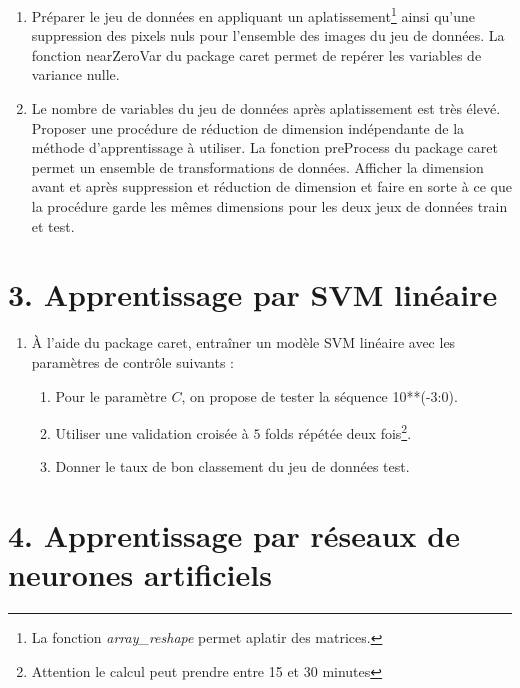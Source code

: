 \documentclass[11pt,]{article}
\begin{document}
\begin{enumerate}
\def\labelenumi{\arabic{enumi}.}
\item
  Préparer le jeu de données en appliquant un aplatissement\footnote{La
    fonction \emph{array\_reshape} permet aplatir des matrices.} ainsi
  qu'une suppression des pixels nuls pour l'ensemble des images du jeu
  de données. La fonction \textsf{nearZeroVar} du package \textsf{caret}
  permet de repérer les variables de variance nulle.
\item
  Le nombre de variables du jeu de données après aplatissement est très
  élevé. Proposer une procédure de réduction de dimension indépendante
  de la méthode d'apprentissage à utiliser. La fonction
  \textsf{preProcess} du package \textsf{caret} permet un ensemble de
  transformations de données. Afficher la dimension avant et après
  suppression et réduction de dimension et faire en sorte à ce que la
  procédure garde les mêmes dimensions pour les deux jeux de données
  train et test.
\end{enumerate}

\hypertarget{apprentissage-par-svm-lineaire}{%
\section{3. Apprentissage par SVM
linéaire}\label{apprentissage-par-svm-lineaire}}

\begin{enumerate}
\def\labelenumi{\arabic{enumi}.}
\setcounter{enumi}{2}
\item
  À l'aide du package \textsf{caret}, entraîner un modèle SVM linéaire
  avec les paramètres de contrôle suivants :

  \begin{enumerate}
  \def\labelenumii{\alph{enumii}.}
  \item
    Pour le paramètre \(C\), on propose de tester la séquence
    \textsf{10**(-3:0)}.
  \item
    Utiliser une validation croisée à \(5\) folds répétée deux
    fois\footnote{Attention le calcul peut prendre entre 15 et 30
      minutes}.
  \item
    Donner le taux de bon classement du jeu de données test.
  \end{enumerate}
\end{enumerate}

\hypertarget{apprentissage-par-reseaux-de-neurones-artificiels}{%
\section{4. Apprentissage par réseaux de neurones
artificiels}\label{apprentissage-par-reseaux-de-neurones-artificiels}}
\end{document}
